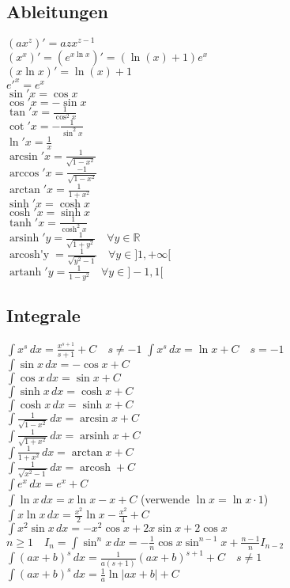 \documentclass[landscape, 10pt]{article}
\newcommand{\R}{\mathbb{R}}
\begin{document}
\begin{multicols}{3}
\subsection{Ableitungen}
$(ax^z)'=azx^{z-1}$\\
$(x^x)'=(e^{x\ln x})'=(\ln(x)+1)e^x$\\
$(x\ln x)'=\ln(x)+1$\\
$e'^x=e^x$\\
$\sin'x=\cos x$\\
$\cos'x=-\sin x$\\
$\tan'x=\frac{1}{\cos^2x}$\\
$\cot'x=-\frac{1}{\sin^2x}$\\
$\ln'x=\frac{1}{x}$\\
$\arcsin'x=\frac{1}{\sqrt{1-x^2}}$\\
$\arccos'x=\frac{-1}{\sqrt{1-x^2}}$\\
$\arctan'x=\frac{1}{1+x^2}$\\
$\sinh'x=\cosh x$\\
$\cosh'x=\sinh x$\\
$\tanh'x=\frac{1}{\cosh^2x}$\\
$\operatorname{arsinh}'y
        =\frac{1}{\sqrt{1+y^2}}\quad\forall y\in\R$\\
$\operatorname{arcosh'y}
        =\frac{1}{\sqrt{y^2-1}}\quad\forall y\in]1,+\infty[$\\
$\operatorname{artanh}'y=\frac{1}{1-y^2}\quad\forall y\in]-1,1[$


\subsection{Integrale}
$\int x^s\,dx=\frac{x^{s+1}}{s+1}+C\quad s\neq-1$\qquad
                $\int x^s\,dx=\ln x+C\quad s=-1$\\
$\int\sin x\,dx=-\cos x+C$\\
$\int\cos x\,dx=\sin x+C$\\
$\int\sinh x\,dx=\cosh x+C$\\
$\int\cosh x\,dx=\sinh x+C$\\
$\int\frac{1}{\sqrt{1-x^2}}\,dx=\arcsin x+C$\\
$\int\frac{1}{\sqrt{1+x^2}}\,dx=\operatorname{arsinh} x+C$\\
$\int\frac{1}{1+x^2}\,dx=\arctan x+C$\\
$\int\frac{1}{\sqrt{x^2-1}}\,dx=\operatorname{arcosh}+C$\\
$\int e^x\,dx=e^x+C$\\
$\int\ln x\,dx=x\ln x-x+C$ (verwende $\ln x=\ln x\cdot1$)\\
$\int x\ln x\,dx=\frac{x^2}{2}\ln x-\frac{x^2}{4}+C$\\
$\int x^2\sin x\,dx=-x^2\cos x+2x\sin x+2\cos x$\\
$n\geqslant1\quad I_n=\int\sin^nx\,dx=-\frac{1}{n}\cos x\sin^{n-1}x
                +\frac{n-1}{n}I_{n-2}$\\
$\int(ax+b)^s\,dx=\frac{1}{a(s+1)}(ax+b)^{s+1}+C\quad s\neq1$\qquad
                $\int(ax+b)^s\,dx=\frac{1}{a}\ln|ax+b|+C$


\end{multicols}
\end{document}

